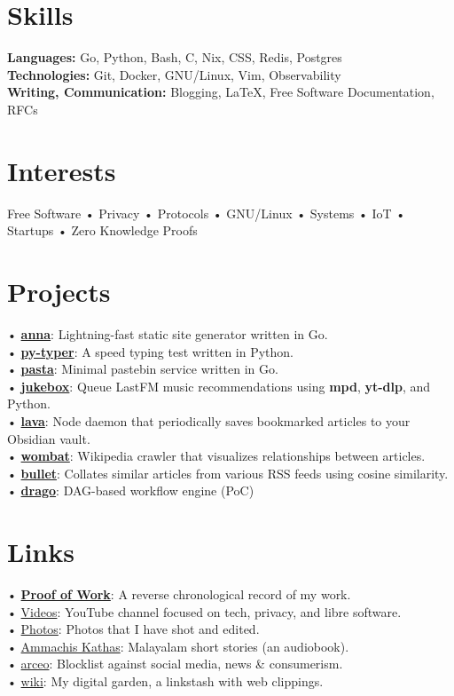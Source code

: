 \documentclass[a4,12pt]{article}
\begin{document}
\section{Skills}
\textbf{Languages:} Go, Python, Bash, C, Nix, CSS, Redis, Postgres \\
\textbf{Technologies:} Git, Docker, GNU/Linux, Vim, Observability \\
\textbf{Writing, Communication:} Blogging, \LaTeX, Free Software Documentation, RFCs

\section{Interests}
Free Software
• Privacy
• Protocols
• GNU/Linux
• Systems
• IoT
• Startups
• Zero Knowledge Proofs

\section{Projects}
• \textbf{\href{https://github.com/anna-ssg/anna}{anna}}: Lightning-fast static site generator written in Go. \\
• \textbf{\href{https://github.com/polarhive/py-typer}{py-typer}}: A speed typing test written in Python. \\
• \textbf{\href{https://polarhive.net/pasta}{pasta}}: Minimal pastebin service written in Go. \\
• \textbf{\href{https://github.com/polarhive/jukebox}{jukebox}}: Queue LastFM music recommendations using \textbf{mpd}, \textbf{yt-dlp}, and Python. \\
• \textbf{\href{https://polarhive.net/lava}{lava}}: Node daemon that periodically saves bookmarked articles to your Obsidian vault. \\
• \textbf{\href{https://github.com/polarhive/wombat}{wombat}}: Wikipedia crawler that visualizes relationships between articles. \\
• \textbf{\href{https://polarhive.net/bullet}{bullet}}: Collates similar articles from various RSS feeds using cosine similarity. \\
• \textbf{\href{https://github.com/polarhive/drago}{drago}}: DAG-based workflow engine (PoC)


\section{Links}
• \textbf{\href{https://polarhive.net/pow}{Proof of Work}}: A reverse chronological record of my work. \\
• \href{https://polarhive.net/videos}{Videos}: YouTube channel focused on tech, privacy, and libre software.\\
• \href{https://polarhive.net/photos}{Photos}: Photos that I have shot and edited. \\
• \href{https://polarhive.net/ammachiskathas}{Ammachis Kathas}: Malayalam short stories (an audiobook). \\
• \href{https://polarhive.net/arceo}{arceo}: Blocklist against social media, news \& consumerism. \\
• \href{https://polarhive.net/wiki}{wiki}: My digital garden, a linkstash with web clippings.
\end{document}
